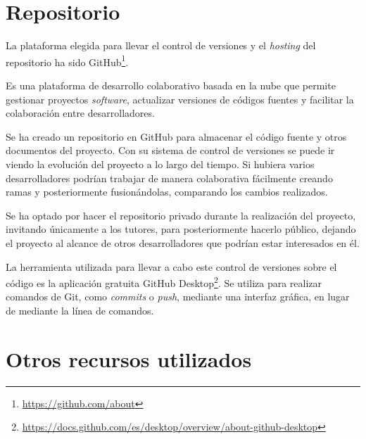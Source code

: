 \section{Repositorio}
La plataforma elegida para llevar el control de versiones y el \textit{hosting} del repositorio ha sido GitHub\footnote{\url{https://github.com/about}}.

Es una plataforma de desarrollo colaborativo basada en la nube que permite gestionar proyectos \textit{software}, actualizar versiones de códigos fuentes y facilitar la colaboración entre desarrolladores.

Se ha creado un repositorio en GitHub para almacenar el código fuente y otros documentos del proyecto. Con su sistema de control de versiones se puede ir viendo la evolución del proyecto a lo largo del tiempo. Si hubiera varios desarrolladores podrían trabajar de manera colaborativa fácilmente creando ramas y posteriormente fusionándolas, comparando los cambios realizados.

Se ha optado por hacer el repositorio privado durante la realización del proyecto, invitando únicamente a los tutores, para posteriormente hacerlo público, dejando el proyecto al alcance de otros desarrolladores que podrían estar interesados en él.

La herramienta utilizada para llevar a cabo este control de versiones sobre el código es la aplicación gratuita GitHub Desktop\footnote{\url{https://docs.github.com/es/desktop/overview/about-github-desktop}}. Se utiliza para realizar comandos de Git, como \textit{commits} o \textit{push}, mediante una interfaz gráfica, en lugar de mediante la línea de comandos.



\section{Otros recursos utilizados}


